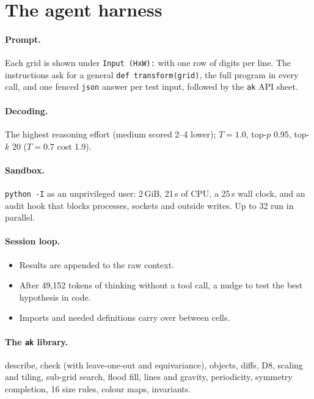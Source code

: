 \documentclass[10pt]{article}
\begin{document}
\section{The agent harness}\label{app:harness}

\paragraph{Prompt.} Each grid is shown under \texttt{Input (HxW):} with one row of digits per line. The instructions ask
for a general \texttt{def transform(grid)}, the full program in every call, and one fenced \texttt{json} answer per test
input, followed by the \texttt{ak} API sheet.

\paragraph{Decoding.} The highest reasoning effort (medium scored 2--4 lower); $T = 1.0$, top-$p$ 0.95, top-$k$ 20
($T = 0.7$ cost 1.9).

\paragraph{Sandbox.} \texttt{python -I} as an unprivileged user: 2\,GiB, 21\,s of CPU, a 25\,s wall clock, and an audit
hook that blocks processes, sockets and outside writes. Up to 32 run in parallel.

\paragraph{Session loop.}
\begin{itemize}
  \item Results are appended to the raw context.
  \item After 49,152 tokens of thinking without a tool call, a nudge to test the best hypothesis in code.
  \item Imports and needed definitions carry over between cells.
\end{itemize}

\paragraph{The \texttt{ak} library.} describe, check (with leave-one-out and equivariance), objects, diffs, D8, scaling
and tiling, sub-grid search, flood fill, lines and gravity, periodicity, symmetry completion, 16 size rules, colour
maps, invariants.
\end{document}
